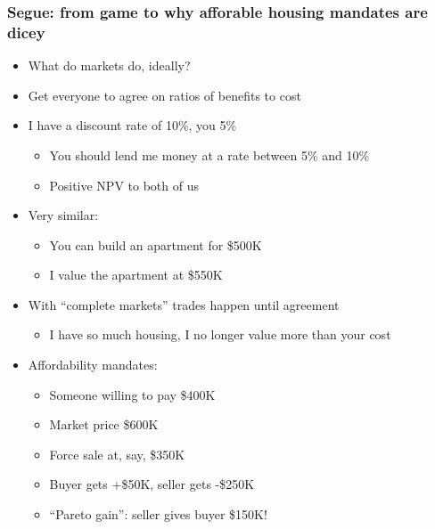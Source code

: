 \documentclass{beamer}
\begin{document}
\begin{frame}
	\frametitle{Segue: from game to why afforable housing mandates are dicey}
	\begin{itemize}
		\item What do markets do, ideally?
		\item Get everyone to agree on ratios of benefits to cost
		\item I have a discount rate of 10\%, you 5\%
			\begin{itemize}
				\item You should lend me money at a rate between 5\% and 10\%
				\item Positive NPV to both of us
			\end{itemize}
		\item Very similar: 
			\begin{itemize}
				\item You can build an apartment for \$500K
				\item I value the apartment at \$550K
			\end{itemize}
		\item With ``complete markets'' trades happen until agreement
			\begin{itemize}
				\item I have so much housing, I no longer value more than your cost
			\end{itemize}
		\item Affordability mandates:
			\begin{itemize}
				\item Someone willing to pay \$400K 
				\item Market price \$600K
				\item Force sale at, say, \$350K
				\item Buyer gets +\$50K, seller gets -\$250K
				\item ``Pareto gain'': seller gives buyer \$150K!
			\end{itemize}
	\end{itemize}
\end{frame}
\end{document}
